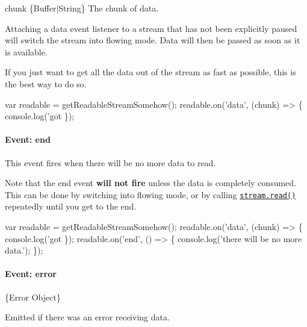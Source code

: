 \begin{DoxyItemize}
\item {\ttfamily chunk} \{Buffer$\vert$\+String\} The chunk of data.
\end{DoxyItemize}

Attaching a {\ttfamily \textquotesingle{}data\textquotesingle{}} event listener to a stream that has not been explicitly paused will switch the stream into flowing mode. Data will then be passed as soon as it is available.

If you just want to get all the data out of the stream as fast as possible, this is the best way to do so.


\begin{DoxyCode}
var readable = getReadableStreamSomehow();
readable.on('data', (chunk) => \{
  console.log('got %
\});
\end{DoxyCode}


\paragraph*{Event\+: \textquotesingle{}end\textquotesingle{}}

This event fires when there will be no more data to read.

Note that the {\ttfamily \textquotesingle{}end\textquotesingle{}} event {\bfseries will not fire} unless the data is completely consumed. This can be done by switching into flowing mode, or by calling \href{#stream_readable_read_size}{\tt {\ttfamily stream.\+read()}} repeatedly until you get to the end.


\begin{DoxyCode}
var readable = getReadableStreamSomehow();
readable.on('data', (chunk) => \{
  console.log('got %
\});
readable.on('end', () => \{
  console.log('there will be no more data.');
\});
\end{DoxyCode}


\paragraph*{Event\+: \textquotesingle{}error\textquotesingle{}}


\begin{DoxyItemize}
\item \{Error Object\}
\end{DoxyItemize}

Emitted if there was an error receiving data.

